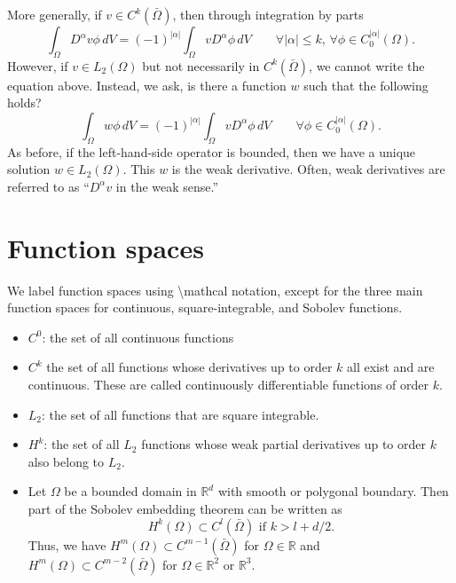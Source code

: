 \documentclass[oneside,a4paper,11pt]{report}
\begin{document}
More generally, if $v \in C^k(\bar{\Omega})$, then through integration by parts
\begin{equation}
    \int_\Omega D^\alpha v \phi \, dV = (-1)^{|\alpha|} \int_\Omega v D^\alpha \phi \, dV \qquad \forall |\alpha| \le k,\, \forall \phi \in C_0^{|\alpha|}(\Omega).
\end{equation}
However, if $v \in L_2(\Omega)$ but not necessarily in $C^k(\bar{\Omega})$, we cannot write the equation above. Instead, we ask, is there a function $w$ such that the following holds?
\begin{equation}
    \int_\Omega w \phi \, dV = (-1)^{|\alpha|} \int_\Omega v D^\alpha \phi \, dV \qquad \forall \phi \in C_0^{|\alpha|}(\Omega).
\end{equation}
As before, if the left-hand-side operator is bounded, then we have a unique solution $w \in L_2(\Omega)$. This $w$ is the weak derivative. Often, weak derivatives are referred to as ``$D^\alpha v$ in the weak sense.''

\section{Function spaces}
We label function spaces using \textbackslash mathcal notation, except for the three main function spaces for continuous, square-integrable, and Sobolev functions. 
\begin{itemize}
    \item $C^0$: the set of all continuous functions
    \item $C^k$ the set of all functions whose derivatives up to order $k$ all exist and are continuous. These are called continuously differentiable functions of order $k$.
    \item $L_2$: the set of all functions that are square integrable.
    \item $H^k$: the set of all $L_2$ functions whose weak partial derivatives up to order $k$ also belong to $L_2$. 
    \item Let $\Omega$ be a bounded domain in $\mathbb{R}^d$ with smooth or polygonal boundary. Then part of the Sobolev embedding theorem can be written as
    \begin{equation}
        H^k(\Omega) \subset C^l(\bar{\Omega}) \text{ if } k > l + d/2.
    \end{equation}
    Thus, we have $H^m(\Omega) \subset C^{m-1}(\bar{\Omega})$ for $\Omega \in \mathbb{R}$ and $H^m(\Omega) \subset C^{m-2}(\bar{\Omega})$ for $\Omega \in \mathbb{R}^2$ or $\mathbb{R}^3$.
\end{itemize}
\end{document}
